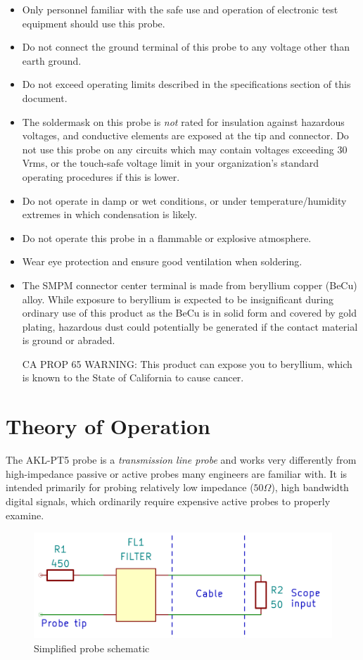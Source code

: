 \documentclass[11pt]{article}
\begin{document}
\begin{itemize}
\item Only personnel familiar with the safe use and operation of electronic test equipment should use this probe.
\item Do not connect the ground terminal of this probe to any voltage other than earth ground.
\item Do not exceed operating limits described in the specifications section of this document.
\item The soldermask on this probe is \emph{not} rated for insulation against hazardous voltages, and conductive
elements are exposed at the tip and connector. Do not use this probe on any circuits which may contain voltages
exceeding 30 Vrms, or the touch-safe voltage limit in your organization's standard operating procedures if this is
lower.
\item Do not operate in damp or wet conditions, or under temperature/humidity extremes in which condensation is
likely.
\item Do not operate this probe in a flammable or explosive atmosphere.
\item Wear eye protection and ensure good ventilation when soldering.
\item The SMPM connector center terminal is made from beryllium copper (BeCu) alloy. While exposure to beryllium is
expected to be insignificant during ordinary use of this product as the BeCu is in solid form and covered by gold
plating, hazardous dust could potentially be generated if the contact material is ground or abraded.

CA PROP 65 WARNING: This product can expose you to beryllium, which is known to the State of California to cause cancer.
\end{itemize}

\pagebreak
\section{Theory of Operation}

The AKL-PT5 probe is a \emph{transmission line probe} and works very differently from high-impedance passive or active
probes many engineers are familiar with. It is intended primarily for probing relatively low impedance ($50 \Omega$),
high bandwidth digital signals, which ordinarily require expensive active probes to properly examine.

\begin{figure}[h]
\centering
\includegraphics[height=4cm]{schematic.png}
\caption{Simplified probe schematic}
\label{schematic}
\end{figure}
\end{document}
